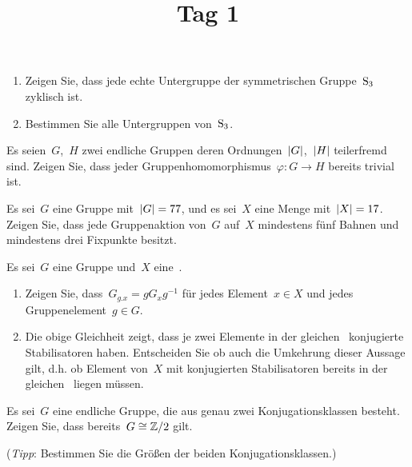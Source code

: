 \documentclass{scrartcl}
\title{\vspace{-1em}Tag 1}
\author{}
\date{}
\begin{document}
\maketitle
\vspace{-7em}


\begin{exercise}
  \leavevmode
  \begin{enumerate}
    \item
      Zeigen Sie, dass jede echte Untergruppe der symmetrischen Gruppe~$\operatorname{S}_3$ zyklisch ist.
    \item
      Bestimmen Sie alle Untergruppen von~$\operatorname{S}_3$.
  \end{enumerate}
\end{exercise}

\begin{exercise}
  Es seien~$G$,~$H$ zwei endliche Gruppen deren Ordnungen~$\lvert G\rvert$,~$\lvert H\rvert$ teilerfremd sind.
  Zeigen Sie, dass jeder Gruppenhomomorphismus~$\varphi \colon G \to H$ bereits trivial ist.
\end{exercise}

\begin{exercise}
  Es sei~$G$ eine Gruppe mit~$\lvert G\rvert = 77$, und es sei~$X$ eine Menge mit~$\lvert X\rvert = 17$.
  Zeigen Sie, dass jede Gruppenaktion von~$G$ auf~$X$ mindestens fünf Bahnen und mindestens drei Fixpunkte besitzt.
\end{exercise}

\begin{exercise}
  Es sei~$G$ eine Gruppe und~$X$ eine~.
  \begin{enumerate}
    \item
      Zeigen Sie, dass~$G_{g.x} = g G_x g^{-1}$ für jedes Element~$x \in X$ und jedes Gruppenelement~$g \in G$.
    \item
      Die obige Gleichheit zeigt, dass je zwei Elemente in der gleichen~ konjugierte Stabilisatoren haben.
      Entscheiden Sie ob auch die Umkehrung dieser Aussage gilt, d.h. ob Element von~$X$ mit konjugierten Stabilisatoren bereits in der gleichen~ liegen müssen.
  \end{enumerate}
\end{exercise}

\begin{exercise}
  Es sei~$G$ eine endliche Gruppe, die aus genau zwei Konjugationsklassen besteht.
  Zeigen Sie, dass bereits~$G \cong \mathbb{Z}/2$ gilt.

  (\emph{Tipp}: Bestimmen Sie die Größen der beiden Konjugationsklassen.)
\end{exercise}
\end{document}
